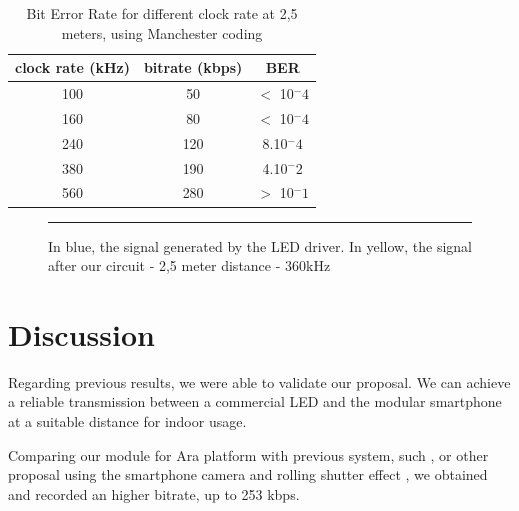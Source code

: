 \begin{table}[htbp]
\begin{center}
\begin{tabular}{|c|c|c|}
  \hline
  clock rate (kHz) & bitrate (kbps) & BER \\
  \hline
  100 & 50 & $<$ 10$^-4$ \\
  160 & 80 & $<$ 10$^-4$ \\
  240 & 120 & 8.10$^-4$ \\
  380 & 190 & 4.10$^-2$ \\
  560 & 280 & $>$ 10$^-1$ \\
  \hline
\end{tabular}
\end{center}
\caption{Bit Error Rate for different clock rate at 2,5 meters, using Manchester coding}
\label{tab:ber-manchester}
\end{table}

\begin{figure}[htbp]
	\centering
		\rule{35em}{0.5pt}
		\caption
        {In blue, the signal generated by the LED driver. In yellow, the signal after our circuit - 2,5 meter distance - 360kHz}
		\label{fig:manchester-problem}
	\end{figure}
    
 

\section{Discussion}

Regarding previous results, we were able to validate our proposal. We can achieve a reliable transmission between a commercial LED and the modular smartphone at a suitable distance for indoor usage.

Comparing our  module for Ara platform with previous system, such \citep{phycomp}, or other proposal using the smartphone camera and rolling shutter effect  \citep{rolling}, we obtained and recorded an higher bitrate, up to 253 kbps.
\citep{phycomp}